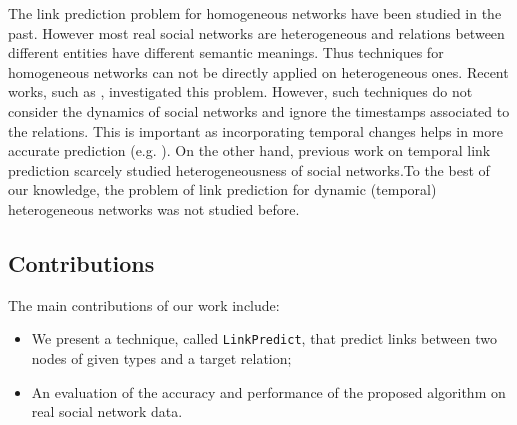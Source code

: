 The link prediction problem for homogeneous networks have been studied in the past. However most real social networks are heterogeneous and relations between different entities have different semantic meanings. Thus techniques for homogeneous networks can not be directly applied on heterogeneous ones. Recent works, such as \cite{sun2011pathsim,sun2011ASONAM}, investigated this problem. However, such techniques do not consider the dynamics of social networks and ignore the timestamps associated to the relations. This is important as incorporating temporal changes helps in more accurate prediction (e.g. \cite{Zhu2016}). On the other hand, previous work on temporal link prediction scarcely studied heterogeneousness of social networks.To the best of our knowledge, the problem of link prediction for dynamic (temporal) heterogeneous networks was not studied before.



\subsection{Contributions}

The main contributions of our work include:

\begin{itemize}

\item We present a technique, called \texttt{LinkPredict}, that predict links between two nodes of given types and a target relation;

\item An evaluation of the accuracy and performance of the proposed algorithm on real social network data.

\end{itemize}






